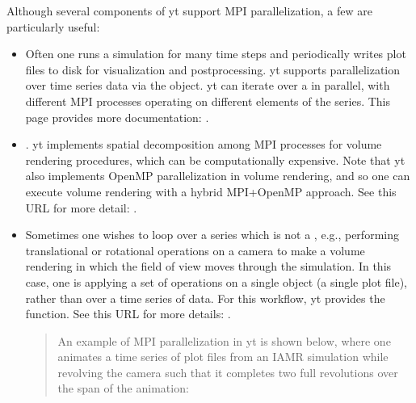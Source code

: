 \documentclass[letterpaper,10pt,english]{sphinxmanual}
\begin{document}
\sphinxAtStartPar
Although several components of yt support MPI parallelization, a few are
particularly useful:
\begin{itemize}
\item {} 
\sphinxAtStartPar
{} Often one runs a simulation for many time steps
and periodically writes plot files to disk for visualization and
post\sphinxhyphen{}processing. yt supports parallelization over time series data via the
 object. yt can iterate over a  in
parallel, with different MPI processes operating on different elements of the
series. This page provides more documentation:
.

\item {} 
\sphinxAtStartPar
{}. yt implements spatial decomposition among MPI
processes for volume rendering procedures, which can be computationally
expensive. Note that yt also implements OpenMP parallelization in volume
rendering, and so one can execute volume rendering with a hybrid MPI+OpenMP
approach. See this URL for more detail:
.

\item {} 
\sphinxAtStartPar
{} Sometimes one wishes to
loop over a series which is not a , e.g., performing
translational or rotational operations on a camera to make a volume rendering
in which the field of view moves through the simulation. In this case, one is
applying a set of operations on a single object (a single plot file), rather
than over a time series of data. For this workflow, yt provides the
 function. See this URL for more details:
.
\begin{quote}

\sphinxAtStartPar
An example of MPI parallelization in yt is shown below, where one animates a
time series of plot files from an IAMR simulation while revolving the camera
such that it completes two full revolutions over the span of the animation:

\begin{sphinxVerbatim}[commandchars=\\\{\}]
 
 
   


\end{sphinxVerbatim}
\end{quote}
\end{itemize}
\end{document}

